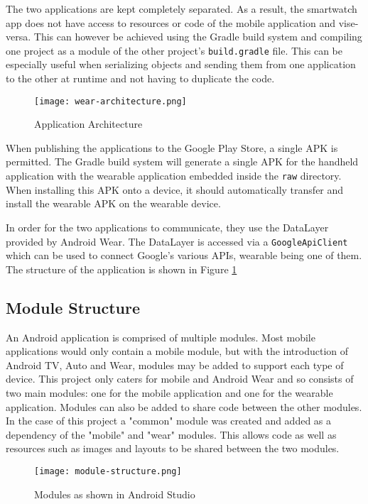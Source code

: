 The two applications are kept completely separated. As a result, the smartwatch
app does not have access to resources or code of the mobile application and
vise-versa. This can however be achieved using the Gradle build system and
compiling one project as a module of the other project's \texttt{build.gradle}
file. This can be especially useful when serializing objects and sending them
from one application to the other at runtime and not having to duplicate the
code.

\begin{figure}
    \centering
    \texttt{[image: wear-architecture.png]}
    \caption{Application Architecture}
    \label{fig:app_structure}
\end{figure}

When publishing the applications to the Google Play Store, a single APK is
permitted. The Gradle build system will generate a single APK for the handheld
application with the wearable application embedded inside the \texttt{raw}
directory. When installing this APK onto a device, it should automatically
transfer and install the wearable APK on the wearable device.

In order for the two applications to communicate, they use the DataLayer
provided by Android Wear. The DataLayer is accessed via a
\texttt{GoogleApiClient} which can be used to connect Google's various APIs,
wearable being one of them. The structure of the application is shown in Figure
\ref{fig:app_structure}

\subsection{Module Structure}

An Android application is comprised of multiple modules. Most mobile
applications would only contain a mobile module, but with the introduction of
Android TV, Auto and Wear, modules may be added to support each type of device.
This project only caters for mobile and Android Wear and so consists of two
main modules: one for the mobile application and one for the wearable
application. Modules can also be added to share code between the other modules.
In the case of this project a "common" module was created and added as a
dependency of the "mobile" and "wear" modules. This allows code as well as
resources such as images and layouts to be shared between the two modules.

\begin{figure}
    \centering
    \texttt{[image: module-structure.png]}
    \caption{Modules as shown in Android Studio}
    \label{fig:desktop_module_structure}
\end{figure}

